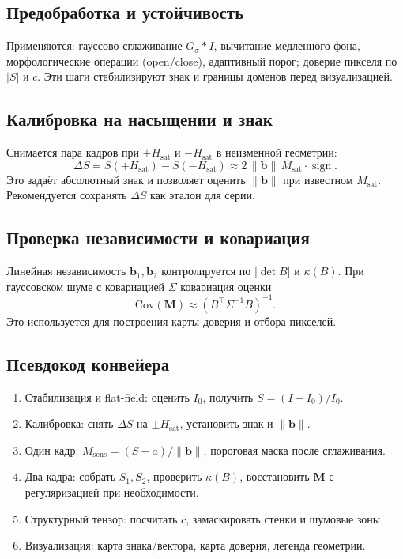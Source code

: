 \documentclass[12pt,a4paper]{article}
\numberwithin{equation}{section}
\begin{document}
\subsection{Предобработка и устойчивость}
Применяются: гауссово сглаживание \(G_\sigma * I\), вычитание медленного фона, морфологические операции (open/close), адаптивный порог; доверие пикселя по \(|S|\) и \(c\). Эти шаги стабилизируют знак и границы доменов перед визуализацией.

\subsection{Калибровка на насыщении и знак}
Снимается пара кадров при \(+H_{\text{sat}}\) и \(-H_{\text{sat}}\) в неизменной геометрии:
\begin{equation}
 \Delta S = S(+H_{\text{sat}})-S(-H_{\text{sat}}) \approx 2\,\|\mathbf b\|\,M_{\text{sat}}\cdot \operatorname{sign}.
\end{equation}
Это задаёт абсолютный знак и позволяет оценить \(\|\mathbf b\|\) при известном \(M_{\text{sat}}\). Рекомендуется сохранять \(\Delta S\) как эталон для серии.

\subsection{Проверка независимости и ковариация}
Линейная независимость \(\mathbf b_1,\mathbf b_2\) контролируется по \(|\det B|\) и \(\kappa(B)\). При гауссовском шуме с ковариацией \(\Sigma\) ковариация оценки
\begin{equation}
 \mathrm{Cov}(\mathbf M) \approx (B^\top \Sigma^{-1} B)^{-1}.
\end{equation}
Это используется для построения карты доверия и отбора пикселей.

\subsection{Псевдокод конвейера}
\begin{enumerate}
  \item Стабилизация и flat-field: оценить \(I_0\), получить \(S=(I-I_0)/I_0\).
  \item Калибровка: снять \(\Delta S\) на \(\pm H_{\text{sat}}\), установить знак и \(\|\mathbf b\|\).
  \item Один кадр: \(M_{\text{sens}}=(S-a)/\|\mathbf b\|\), пороговая маска после сглаживания.
  \item Два кадра: собрать \(S_1,S_2\), проверить \(\kappa(B)\), восстановить \(\mathbf M\) с регуляризацией при необходимости.
  \item Структурный тензор: посчитать \(c\), замаскировать стенки и шумовые зоны.
  \item Визуализация: карта знака/вектора, карта доверия, легенда геометрии.
\end{enumerate}
\end{document}
